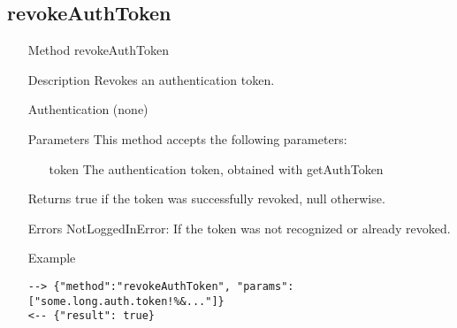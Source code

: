\documentclass[a4paper]{scrreprt}
\begin{document}
\subsection{revokeAuthToken}
\begin{enumerate}
\item[Method] revokeAuthToken
\item[Description] Revokes an authentication token.
\item[Authentication] (none)
\item[Parameters] This method accepts the following parameters:
\begin{enumerate}
    \item[token] The authentication token, obtained with getAuthToken
    \end{enumerate}
\item[Returns] true if the token was successfully revoked, null otherwise.
\item[Errors] NotLoggedInError: If the token was not recognized or already revoked.
\item[Example]
\begin{lstlisting}
--> {"method":"revokeAuthToken", "params":["some.long.auth.token!%&..."]}
<-- {"result": true}
\end{lstlisting}
\end{enumerate}

\clearpage
\end{document}
